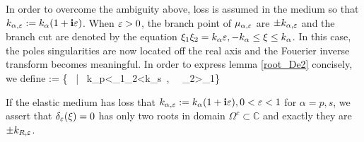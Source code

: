 \documentclass[12pt]{iopart}
\begin{document}
In order to overcome the ambiguity above, loss is assumed in the medium so that $k_{\alpha,\varepsilon}:=k_\alpha(1+\mathbf{i}\varepsilon)$.
When $\varepsilon>0$, the branch point of $\mu_{\alpha,\varepsilon}$ are $\pm k_{\alpha,\varepsilon}$ and the branch cut are denoted by the equation $\xi_1\xi_2=k_\alpha \varepsilon,-k_\alpha\leq \xi \leq k_\alpha$. In this case, the poles singularities are now located off the real axis and the Fouerier inverse transform becomes meaningful. In order to express lemma \ref{root_De2} concisely, we define
\be
\Omega := \{\xi \in {} \ | \ k_p\ep<\xi_1\xi_2<k_s\ep \ , \  \ \xi_2>\xi_1\ep\}
\ee
\begin{lem}\label{root_De2}
	If the elastic medium has loss that $k_{\alpha,\varepsilon}:=k_\alpha(1+\mathbf{i}\varepsilon),0<\varepsilon<1$ for $\alpha=p,s$, we assert that $\delta_\varepsilon(\xi)=0$ has only two roots in domain $\Omega^c \subset \mathbb{C}$ and exactly they are $\pm k_{R,\varepsilon}$.
\end{lem}
\end{document}
